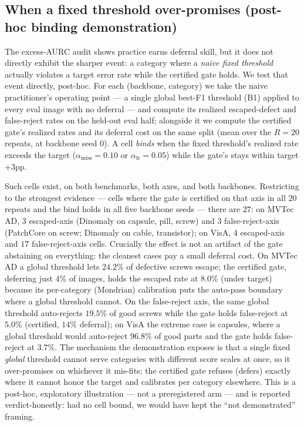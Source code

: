 \documentclass[preprint,11pt]{elsarticle}
\begin{document}
\subsection{When a fixed threshold over-promises (post-hoc binding demonstration)}
\label{sec:binding}

The excess-AURC audit shows practice earns deferral skill, but it does not directly exhibit the
sharper event: a category where a \emph{naive fixed threshold} actually violates a target error
rate while the certified gate holds. We test that event directly, post-hoc. For each
(backbone, category) we take the naive practitioner's operating point --- a single global best-F1
threshold (B1) applied to every eval image with no deferral --- and compute its realized
escaped-defect and false-reject rates on the held-out eval half; alongside it we compute the
certified gate's realized rates and its deferral cost on the same split (mean over the $R=20$
repeats, at backbone seed $0$). A cell \emph{binds} when the fixed threshold's realized rate
exceeds the target ($\alpha_{\text{miss}}=0.10$ or $\alpha_{\text{fr}}=0.05$) while the gate's stays
within target$+3$pp.

Such cells exist, on both benchmarks, both axes, and both backbones. Restricting to the strongest
evidence --- cells where the gate is certified on that axis in all $20$ repeats and the bind
holds in all five backbone seeds --- there are $27$: on MVTec AD, $3$ escaped-axis (Dinomaly on
capsule, pill, screw) and $3$ false-reject-axis (PatchCore on screw; Dinomaly on cable,
transistor); on VisA, $4$ escaped-axis and $17$ false-reject-axis cells. Crucially the effect is not
an artifact of the gate abstaining on everything: the cleanest cases pay a small deferral cost. On
MVTec AD a global threshold lets $24.2\%$ of defective screws escape; the certified gate,
deferring just $4\%$ of images, holds the escaped rate at $8.0\%$ (under target) because its
per-category (Mondrian) calibration puts the auto-pass boundary where a global threshold cannot. On
the false-reject axis, the same global threshold auto-rejects $19.5\%$ of good screws while the gate
holds false-reject at $5.0\%$ (certified, $14\%$ deferral); on VisA the extreme case is capsules,
where a global threshold would auto-reject $96.8\%$ of good parts and the gate holds false-reject at
$3.7\%$. The mechanism the demonstration exposes is that a single fixed \emph{global} threshold
cannot serve categories with different score scales at once, so it over-promises on whichever it
mis-fits; the certified gate refuses (defers) exactly where it cannot honor the target and
calibrates per category elsewhere. This is a post-hoc, exploratory illustration --- not a
preregistered arm --- and is reported verdict-honestly: had no cell bound, we would have kept the
``not demonstrated'' framing.
\end{document}
